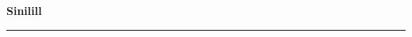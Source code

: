 \documentclass[10pt]{book}
\begin{document}
{
  \samepage
  \raggedbottom
  \raggedright
  \sloppy


  \vspace{0.2in}

  \noindent\begin{minipage}{.1\textwidth}
    \hfill\vspace{0.1in}
  \end{minipage}%
  \noindent\begin{minipage}{.8\textwidth}
    \centering
    \bfseries
    \large Sinilill
  \end{minipage}%
  \noindent\begin{minipage}{.1\textwidth}
      \hfill\vspace{0.1in}
  \end{minipage}

  \nopagebreak[4]
  \vspace{0.1in}
  \nopagebreak[4]
  \hrule height 0.05ex
  \nopagebreak[4]
  \vspace{-0.05in}




}
\end{document}
